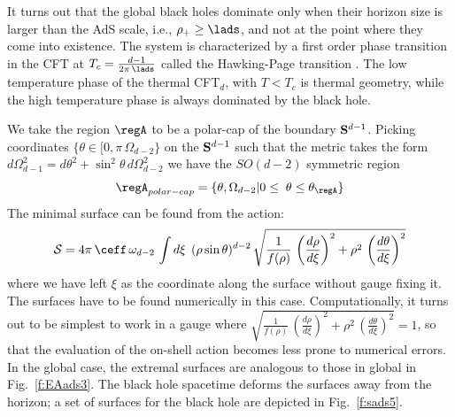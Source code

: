 \documentclass[12pt,openany]{book}
\begin{document}
It turns out that the global black holes dominate  only when their horizon size is larger than the AdS scale, i.e.,  $\rho_+ \geq \lads$, and not at the point where they come into existence. The system is characterized by a first order phase transition in the CFT   \cite{Witten:1998zw} at  $T_c = \frac{d-1}{2\pi\,\lads}$  called the Hawking-Page transition \cite{Hawking:1982dh}.
The low temperature  phase of the thermal CFT$_d$, with  $T < T_c $ is thermal  geometry, while the high temperature phase is always dominated by the  black hole.

We take the region $\regA$ to be a polar-cap of the boundary ${\bf S}^{d-1}$. Picking coordinates  $\{\theta \in [0,\pi\, \Omega_{d-2}\} $ on the ${\bf S}^{d-1}$ such that the metric takes the form $d\Omega_{d-1}^2 = d\theta^2 + \sin^2\theta\, d\Omega_{d-2}^2$ we have the $SO(d-2)$ symmetric region
%
\begin{equation}
\regA_{polar-cap} = \{\theta, \Omega_{d-2} | 0\leq \; \theta \leq \theta_\regA\}
\label{}
\end{equation}
%
The minimal surface can be found from the action:
%
\begin{equation}
{\cal S} = 4\pi\, \ceff\, \omega_{d-2} \, \int d\xi\, \; (\rho\sin\theta)^{d-2} \,
\sqrt{\frac{1}{f(\rho)} \, \left(\frac{d\rho}{d\xi}\right)^2  + \rho^2 \, \left(\frac{d\theta}{d\xi}\right)^2 }
\label{}
\end{equation}
%
where we have left $\xi$ as the coordinate along the surface without gauge fixing it. The surfaces have to be found numerically in this case.
Computationally, it turns out to be simplest to work in a gauge where
$\sqrt{\frac{1}{f(\rho)} \, \left(\frac{d\rho}{d\xi}\right)^2  + \rho^2 \, \left(\frac{d\theta}{d\xi}\right)^2 }
= 1$, so that the evaluation of the on-shell action becomes less prone to numerical errors.  In the global  case, the extremal surfaces are analogous to those in global   in Fig.~\ref{f:EAads3}. The black hole spacetime deforms the surfaces away from the horizon; a set of surfaces for the  black hole are depicted in Fig.~\ref{f:sads5}.
\end{document}
